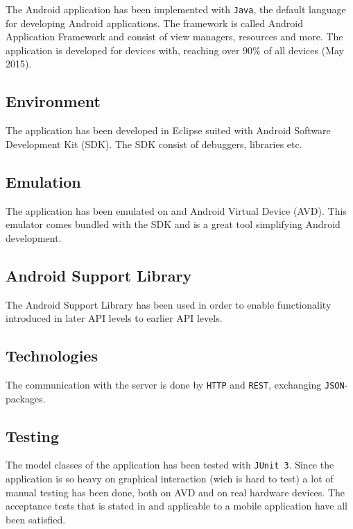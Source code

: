 The Android application has been implemented with \verb!Java!, the default language for developing Android applications. The framework is called Android Application Framework and consist of view managers, resources and more. The application is developed for devices with, reaching over 90\% of all devices (May 2015).
\subsection{Environment}
		The application has been developed in Eclipse suited with Android Software Development Kit (SDK). The SDK consist of debuggers, libraries etc.
\subsection{Emulation}
		The application has been emulated on and Android Virtual Device (AVD). This emulator comes bundled with the SDK and is a great tool simplifying Android development.
\subsection{Android Support Library}
		The Android Support Library has been used in order to enable functionality introduced in later API levels to earlier API levels.
\subsection{Technologies}
	The communication with the server is done by \verb!HTTP! and \verb!REST!, exchanging \verb!JSON!-packages.
\subsection{Testing}
	The model classes of the application has been tested with \verb!JUnit 3!. Since the application is so heavy on graphical interaction (wich is hard to test) a lot of manual testing has been done, both on AVD and on real hardware devices. The acceptance tests that is stated in  and applicable to a mobile application have all been satisfied.

